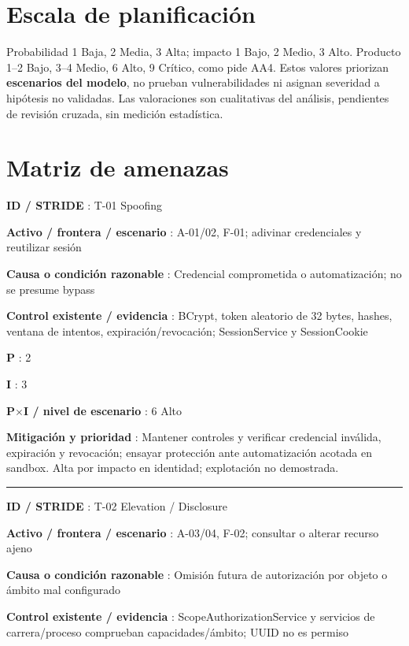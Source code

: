 \documentclass[12pt,a4paper]{report}
\begin{document}
\section{Escala de
planificación}\label{ACD4-semana-4-anexo0-escala-de-planificaciuxf3n}

Probabilidad 1 Baja, 2 Media, 3 Alta; impacto 1 Bajo, 2 Medio, 3 Alto.
Producto 1--2 Bajo, 3--4 Medio, 6 Alto, 9 Crítico, como pide AA4. Estos
valores priorizan \textbf{escenarios del modelo}, no prueban
vulnerabilidades ni asignan severidad a hipótesis no validadas. Las
valoraciones son cualitativas del análisis, pendientes de revisión
cruzada, sin medición estadística.

\section{Matriz de
amenazas}\label{ACD4-semana-4-anexo0-matriz-de-amenazas}

\textbf{ID / STRIDE }: T-01 Spoofing

\textbf{Activo / frontera / escenario }: A-01/02, F-01; adivinar
credenciales y reutilizar sesión

\textbf{Causa o condición razonable }: Credencial comprometida o
automatización; no se presume bypass

\textbf{Control existente / evidencia }: BCrypt, token aleatorio de 32
bytes, hashes, ventana de intentos, expiración/revocación;
SessionService y SessionCookie

\textbf{P }: 2

\textbf{I }: 3

\textbf{P\ensuremath{\times}I / nivel de escenario }: 6 Alto

\textbf{Mitigación y prioridad }: Mantener controles y verificar
credencial inválida, expiración y revocación; ensayar protección ante
automatización acotada en sandbox. Alta por impacto en identidad;
explotación no demostrada.

\medskip\hrule\medskip

\textbf{ID / STRIDE }: T-02 Elevation / Disclosure

\textbf{Activo / frontera / escenario }: A-03/04, F-02; consultar o
alterar recurso ajeno

\textbf{Causa o condición razonable }: Omisión futura de autorización
por objeto o ámbito mal configurado

\textbf{Control existente / evidencia }: ScopeAuthorizationService y
servicios de carrera/proceso comprueban capacidades/ámbito; UUID no es
permiso
\end{document}
